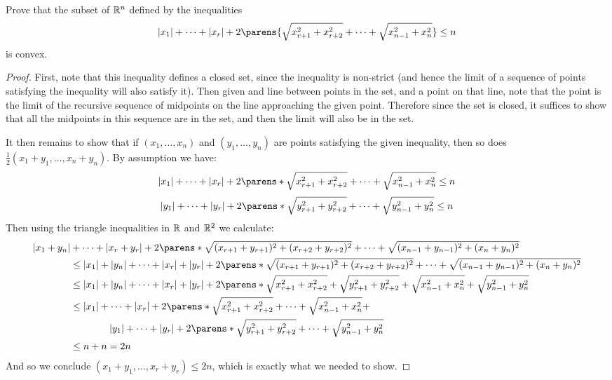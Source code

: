 \documentclass[11pt]{article}
\begin{document}
Prove that the subset of $\mathbb{R}^n$ defined by the inequalities
\begin{equation*}
  |x_1| + \dots + |x_r| + 2\parens{\sqrt{x_{r+1}^2 + x_{r+2}^2} + \dots + \sqrt{x_{n-1}^2 + x_{n}^2}} \le n
\end{equation*}
is convex.

\begin{proof}
  First, note that this inequality defines a closed set, since the inequality is non-strict (and hence the limit of a sequence of points satisfying the inequality will also satisfy it). Then given and line between points in the set, and a point on that line, note that the point is the limit of the recursive sequence of midpoints on the line approaching the given point. Therefore since the set is closed, it suffices to show that all the midpoints in this sequence are in the set, and then the limit will also be in the set.

  It then remains to show that if $(x_1, \dots, x_n)$ and $(y_1, \dots, y_n)$ are points satisfying the given inequality, then so does $\frac{1}{2}(x_1 + y_1, \dots, x_n + y_n)$. By assumption we have:
  \begin{equation*}
    |x_1| + \dots + |x_r| + 2\parens*{\sqrt{x_{r+1}^2 + x_{r+2}^2} + \dots + \sqrt{x_{n-1}^2 + x_{n}^2}} \le n
  \end{equation*}
  \begin{equation*}
    |y_1| + \dots + |y_r| + 2\parens*{\sqrt{y_{r+1}^2 + y_{r+2}^2} + \dots + \sqrt{y_{n-1}^2 + y_{n}^2}} \le n
  \end{equation*}
  Then using the triangle inequalities in $\mathbb{R}$ and $\mathbb{R}^2$ we calculate:
  \begin{align*}
    |x_1 + y_n| &+ \dots + |x_r + y_r| + 2\parens*{\sqrt{(x_{r+1} + y_{r+1})^2 + (x_{r+2} + y_{r+2})^2} + \dots + \sqrt{(x_{n-1} + y_{n-1})^2 + (x_{n} + y_{n})^2}} \\
                &\le |x_1| + |y_n| + \dots + |x_r| + |y_r| + 2\parens*{\sqrt{(x_{r+1} + y_{r+1})^2 + (x_{r+2} + y_{r+2})^2} + \dots + \sqrt{(x_{n-1} + y_{n-1})^2 + (x_{n} + y_{n})^2}} \\
                &\le |x_1| + |y_n| + \dots + |x_r| + |y_r| + 2\parens*{\sqrt{x_{r+1}^2 + x_{r+2}^2} + \sqrt{y_{r+1}^2 + y_{r+2}^2} + \sqrt{x_{n-1}^2 + x_n^2} + \sqrt{y_{n-1}^2 + y_n^2}} \\
                &\le |x_1| + \dots + |x_r| + 2\parens*{\sqrt{x_{r+1}^2 + x_{r+2}^2} + \dots + \sqrt{x_{n-1}^2 + x_{n}^2}} + \\ &\quad \quad \quad \quad |y_1| + \dots + |y_r| + 2\parens*{\sqrt{y_{r+1}^2 + y_{r+2}^2} + \dots + \sqrt{y_{n-1}^2 + y_{n}^2}} \\
                &\le n + n = 2n
  \end{align*}
  And so we conclude $(x_1 + y_1, \dots, x_r + y_r) \le 2n$, which is exactly what we needed to show.
\end{proof}
\end{document}
